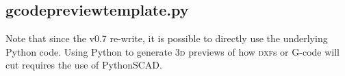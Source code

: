 \documentclass{ltxdoc}
\begin{document}

\subsection{gcodepreviewtemplate.py}
           
Note that since the v0.7 re-write, it is possible to directly use the underlying Python code. Using Python to generate \textsc{3d} previews of how \textsc{dxf}s or G-code will cut requires the use of PythonSCAD.


\lstset{firstnumber=1}%
\end{document}
